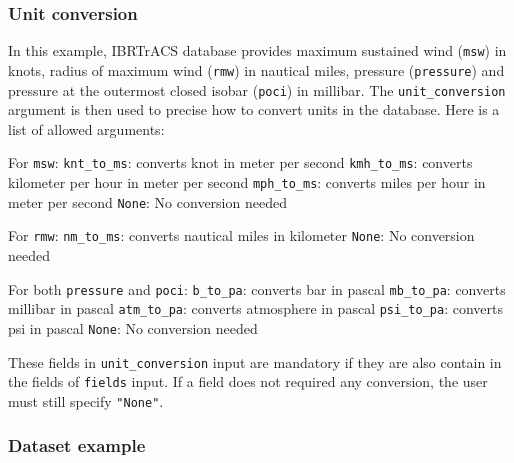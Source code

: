 \documentclass[
]{article}
\begin{document}
\hypertarget{unit-conversion-1}{%
\subsubsection{Unit conversion}\label{unit-conversion-1}}

In this example, IBRTrACS database provides maximum sustained wind
(\texttt{msw}) in knots, radius of maximum wind (\texttt{rmw}) in
nautical miles, pressure (\texttt{pressure}) and pressure at the
outermost closed isobar (\texttt{poci}) in millibar. The
\texttt{unit\_conversion} argument is then used to precise how to
convert units in the database. Here is a list of allowed arguments:

For \texttt{msw}: \newline \texttt{knt\_to\_ms}: converts knot in meter
per second \newline \texttt{kmh\_to\_ms}: converts kilometer per hour in
meter per second \newline \texttt{mph\_to\_ms}: converts miles per hour
in meter per second \newline \texttt{None}: No conversion needed
\newline

For \texttt{rmw}: \newline \texttt{nm\_to\_ms}: converts nautical miles
in kilometer \newline \texttt{None}: No conversion needed \newline

For both \texttt{pressure} and \texttt{poci}: \newline
\texttt{b\_to\_pa}: converts bar in pascal \newline \texttt{mb\_to\_pa}:
converts millibar in pascal \newline \texttt{atm\_to\_pa}: converts
atmosphere in pascal \newline \texttt{psi\_to\_pa}: converts psi in
pascal \newline \texttt{None}: No conversion needed \newline

These fields in \texttt{unit\_conversion} input are mandatory if they
are also contain in the fields of \texttt{fields} input. If a field does
not required any conversion, the user must still specify
\texttt{"None"}.

\hypertarget{dataset-example}{%
\subsubsection{Dataset example}\label{dataset-example}}
\end{document}
